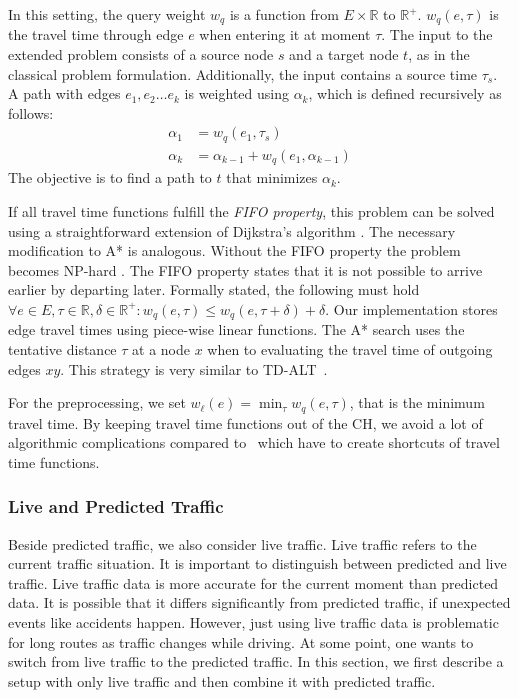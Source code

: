 \documentclass[a4paper,UKenglish,cleveref, autoref, thm-restate]{lipics-v2021}
\begin{document}
In this setting, the query weight $w_q$ is a function from $E\times \mathbb{R}$ to $\mathbb{R}^+$.
$w_q(e, \tau)$ is the travel time through edge $e$ when entering it at moment $\tau$.
The input to the extended problem consists of a source node $s$ and a target node $t$, as in the classical problem formulation.
Additionally, the input contains a source time $\tau_s$.
A path with edges $e_1,e_2\ldots e_k$ is weighted using $\alpha_k$, which is defined recursively as follows:\[
\begin{split}
\alpha_{1} & = w_q(e_1, \tau_s) \\
\alpha_{k} & = \alpha_{k-1} + w_q(e_1, \alpha_{k-1})
\end{split}
\]
The objective is to find a path to $t$ that minimizes $\alpha_k$.

If all travel time functions fulfill the \emph{FIFO property}, this problem can be solved using a straightforward extension of Dijkstra's algorithm \cite{d-aassp-69}.
The necessary modification to A* is analogous.
Without the FIFO property the problem becomes NP-hard \cite{or-tnp-89}.
The FIFO property states that it is not possible to arrive earlier by departing later.
Formally stated, the following must hold $\forall e\in E,\tau\in \mathbb{R},\delta\in \mathbb{R}^+: w_q(e, \tau) \le w_q(e, \tau+\delta) + \delta$.
Our implementation stores edge travel times using piece-wise linear functions.
The A* search uses the tentative distance $\tau$ at a node $x$ when to evaluating the travel time of outgoing edges $x y$.
This strategy is very similar to TD-ALT~\cite{ndls-bastd-12,dw-lbrdg-07}.

For the preprocessing, we set $w_\ell(e) = \min_\tau w_q(e,\tau)$, that is the minimum travel time.
By keeping travel time functions out of the CH, we avoid a lot of algorithmic complications compared to~\cite{bgsv-mtdtt-13,bdpw-dtdrp-16,swz-sfert-20,dn-crdtd-12} which have to create shortcuts of travel time functions.

\subsubsection{Live and Predicted Traffic}
\label{sec:live-predicted-traffic}

Beside predicted traffic, we also consider live traffic.
Live traffic refers to the current traffic situation.
It is important to distinguish between predicted and live traffic.
Live traffic data is more accurate for the current moment than predicted data.
It is possible that it differs significantly from predicted traffic, if unexpected events like accidents happen.
However, just using live traffic data is problematic for long routes as traffic changes while driving.
At some point, one wants to switch from live traffic to the predicted traffic.
In this section, we first describe a setup with only live traffic and then combine it with predicted traffic.
\end{document}
